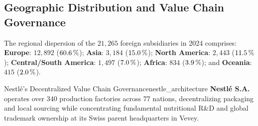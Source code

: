 \subsection{Geographic Distribution and Value Chain Governance}

The regional dispersion of the $21,265$ foreign subsidiaries in 2024 comprises: \textbf{Europe}: $12,892$ ($60.6\,\%$); \textbf{Asia}: $3,184$ ($15.0\,\%$); \textbf{North America}: $2,443$ ($11.5\,\%$); \textbf{Central/South America}: $1,497$ ($7.0\,\%$); \textbf{Africa}: $834$ ($3.9\,\%$); and \textbf{Oceania}: $415$ ($2.0\,\%$).

\begin{mnecase}{Nestlé's Decentralized Value Chain Governance}{nestle_architecture}
\textbf{Nestlé S.A.} operates over 340 production factories across 77 nations, decentralizing packaging and local sourcing while concentrating fundamental nutritional R\&D and global trademark ownership at its Swiss parent headquarters in Vevey.
\end{mnecase}
